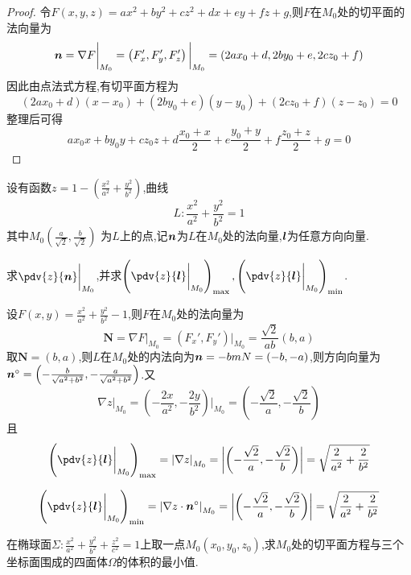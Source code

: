 \begin{proof}
    令$F(x,y,z) = ax^2 + by^2 + cz^2 + dx + ey + fz + g$,则$F$在$M_0$处的切平面的法向量为
    $$\bm{n} = \nabla F \bigg|_{M_0} = \left( F_x',F_y',F_z' \right) \bigg|_{M_0} = \left( 2ax_0 + d, 2by_0 + e, 2cz_0 + f \right)$$
    因此由点法式方程,有切平面方程为
    $$(2ax_0 +d)(x-x_0) + (2by_0 + e)(y-y_0) + (2cz_0 + f)(z-z_0) = 0$$
    整理后可得
    $$ax_0x + by_0y + cz_0z + d\frac{x_0+x}{2} + e\frac{y_0+y}{2} + f\frac{z_0+z}{2} + g = 0$$
\end{proof}


\begin{example}
    设有函数$z = 1 - \left( \frac{x^2}{a^2} + \frac{y^2}{b^2} \right)$,曲线
    $$L: \frac{x^2}{a^2} + \frac{y^2}{b^2} = 1$$
    其中$M_0 \left(\frac{a}{\sqrt{2}},\frac{b}{\sqrt{2}} \right)$
    为$L$上的点,记$\bm{n}$为$L$在$M_0$处的法向量,$\bm{l}$为任意方向向量.
    
    求$\pdv{z}{\n} \bigg|_{M_0}$,并求$\left( \pdv{z}{\l} \bigg|_{M_0} \right)_{\max} , \left( \pdv{z}{\l} \bigg|_{M_0} \right)_{\min}$.
\end{example}

\begin{solution}
    设$F(x,y) = \frac{x^2}{a^2} + \frac{y^2}{b^2} - 1$,则$F$在$M_0$处的法向量为
    $$\bm N = \nabla F \bigg|_{M_0} = \left( F_x',F_y' \right) \bigg|_{M_0} = \frac{\sqrt 2}{ab} \left( b,a \right) $$
    取$\bm N = (b,a)$,则$L$在$M_0$处的内法向为$\bm{n} = -bm N = (-b,-a)$,则方向向量为$\bm{n}^\circ = \left( -\frac{b}{\sqrt{a^2 + b^2}}, -\frac{a}{\sqrt{a^2 + b^2}} \right)$.又
    $$\nabla z \bigg|_{M_0} = \left( -\frac{2x}{a^2}, -\frac{2y}{b^2} \right) \bigg|_{M_0} = \left( -\frac{\sqrt 2}{a}, -\frac{\sqrt 2}{b} \right)$$
    且
    $$\left( \pdv{z}{\l} \bigg|_{M_0} \right)_{\max} = \left| \nabla z \right|_{M_0} = \left| \left(-\frac{\sqrt 2}{a}, -\frac{\sqrt 2}{b} \right) \right| = \sqrt{\frac{2}{a^2} + \frac{2}{b^2}}$$

    $$\left( \pdv{z}{\l} \bigg|_{M_0} \right)_{\min} = \left| \nabla z \cdot \n^\circ \right|_{M_0} = \left| \left(-\frac{\sqrt 2}{a}, -\frac{\sqrt 2}{b} \right) \right| = \sqrt{\frac{2}{a^2} + \frac{2}{b^2}}$$
\end{solution}

\begin{example}
    在椭球面$\Sigma: \frac{x^2}{a^2} + \frac{y^2}{b^2} + \frac{z^2}{c^2} = 1$上取一点$M_0(x_0,y_0,z_0)$,求$M_0$处的切平面方程与三个坐标面围成的四面体$\Omega$的体积的最小值.
\end{example}

